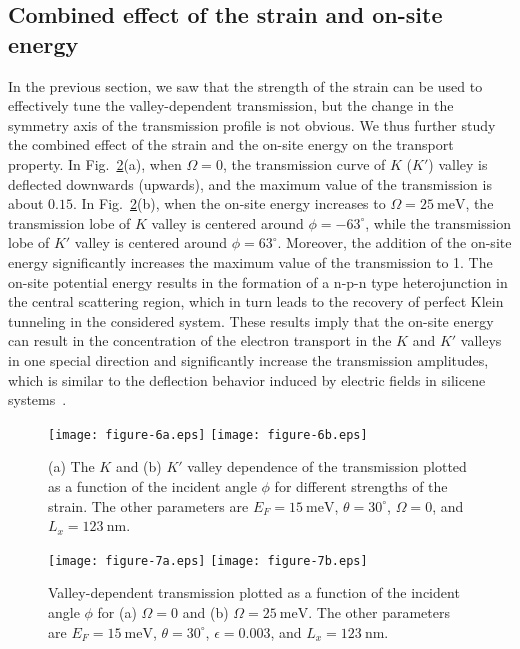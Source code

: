\documentclass[reprint,amsmath,amssymb,aps,superscriptaddress]{revtex4-2}
\begin{document}
\subsection{Combined effect of the strain and on-site energy}
In the previous section, we saw that the strength of the strain can be used to effectively tune the valley-dependent transmission, but the change in the symmetry axis of the transmission profile is not obvious. We thus further study the combined effect of the strain and the on-site energy on the transport property. In Fig.~\ref{fig:TransT7}(a), when $\Omega=0$, the transmission curve of $K$ ($K'$) valley is deflected downwards (upwards), and the maximum value of the transmission is about $0.15$. In Fig.~\ref{fig:TransT7}(b), when the on-site energy increases to $\Omega=25\ \mathrm{meV}$, the transmission lobe of $K$ valley is centered around $\phi=-63^\circ$, while the transmission lobe of $K'$ valley is centered around $\phi=63^\circ$. Moreover, the addition of the on-site energy significantly increases the maximum value of the transmission to 1. The on-site potential energy results in the formation of a n-p-n type
heterojunction in the central scattering region, which in turn leads to the recovery of perfect Klein tunneling in the considered system. These results imply that the on-site energy can result in the concentration of the electron transport in the $K$ and $K'$ valleys in one special direction and significantly increase the transmission amplitudes, which is similar to the deflection behavior induced by electric fields in silicene systems~\cite{liyuan2018}.
\begin{figure}[t]
	\centering
	\texttt{[image: figure-6a.eps]}%
	\texttt{[image: figure-6b.eps]}%
	\caption{\label{fig:TransT6} (a) The $K$ and (b) $K'$ valley dependence of the transmission plotted as a function of the incident angle $\phi$ for different strengths of the strain. The other parameters are $E_F=15\ \mathrm{meV}$, $\theta=30^\circ$, $\Omega=0$, and $L_{x}=123\ \mathrm{nm}$.}
\end{figure}
\begin{figure}[b]
	\centering
	\texttt{[image: figure-7a.eps]}%
	\texttt{[image: figure-7b.eps]}%
	\caption{\label{fig:TransT7} Valley-dependent transmission plotted as a function of the incident angle $\phi$ for (a) $\Omega=0$ and (b) $\Omega=25\ \mathrm{meV}$. The other parameters are $E_F=15\ \mathrm{meV}$, $\theta=30^\circ$, $\epsilon=0.003$, and $L_{x}=123\ \mathrm{nm}$.}
\end{figure}
\end{document}
